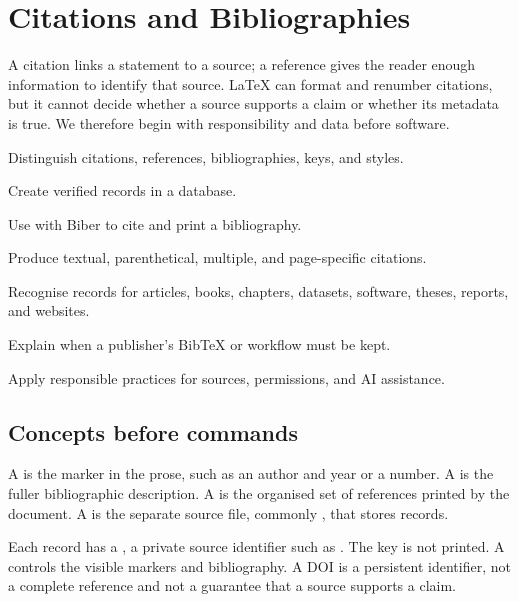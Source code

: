 \chapter{Citations and Bibliographies}
\label{chap:citations}

A citation links a statement to a source; a reference gives the reader enough
information to identify that source. \LaTeX{} can format and renumber citations,
but it cannot decide whether a source supports a claim or whether its metadata
is true. We therefore begin with responsibility and data before software.

\begin{learningoutcomes}
  \item Distinguish citations, references, bibliographies, keys, and styles.
  \item Create verified records in a  database.
  \item Use  with Biber to cite and print a bibliography.
  \item Produce textual, parenthetical, multiple, and page-specific citations.
  \item Recognise records for articles, books, chapters, datasets, software,
        theses, reports, and websites.
  \item Explain when a publisher's BibTeX or  workflow must be kept.
  \item Apply responsible practices for sources, permissions, and AI assistance.
\end{learningoutcomes}

\section{Concepts before commands}

A  is the marker in the prose, such as an author and year or a
number. A  is the fuller bibliographic description. A
 is the organised set of references printed by the
document. A  is the separate source file, commonly
, that stores records.

Each record has a , a private source identifier such as
. The key is not printed. A  controls
the visible markers and bibliography. A DOI is a persistent identifier, not a
complete reference and not a guarantee that a source supports a claim.

